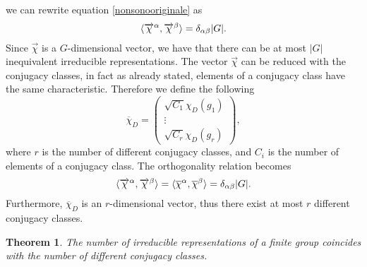 \documentclass[12pt]{book}
\theoremstyle{plain}
\newtheorem{thm}{Theorem}[section]
\theoremstyle{definition}
\theoremstyle{remark}
\begin{document}
we can rewrite equation \eqref{nonsonooriginale} as
\[\braket{\overrightarrow{\chi}^\alpha ,\overrightarrow{\chi}^\beta} = \delta_{\alpha\beta}|G|.\]
Since $\overrightarrow{\chi}$ is a $G$-dimensional vector, we have that there can be at most $|G|$ inequivalent irreducible representations. The vector $\overrightarrow{\chi}$ can be reduced with the conjugacy classes, in fact as already stated, elements of a conjugacy class have the same characteristic. Therefore we define the following
\[\overline{\chi}_D = \begin{pmatrix} \sqrt{C_1} \chi_D(g_1) \\ \vdots \\ \sqrt{C_r} \chi_D(g_r)
\end{pmatrix},\]
where $r$ is the number of different conjugacy classes, and $C_i$ is the number of elements of a conjugacy class. The orthogonality relation becomes
\[\braket{\overrightarrow{\chi}^\alpha ,\overrightarrow{\chi}^\beta} = \braket{\overline{\chi}^\alpha,\overline{\chi}^\beta} = \delta_{\alpha\beta}|G|.\]
Furthermore, $\overline{\chi}_D$ is an $r$-dimensional vector, thus there exist at most $r$ different conjugacy classes. 
\begin{thm}
The number of irreducible representations of a finite group coincides with the number of different conjugacy classes.
\end{thm}
\end{document}
